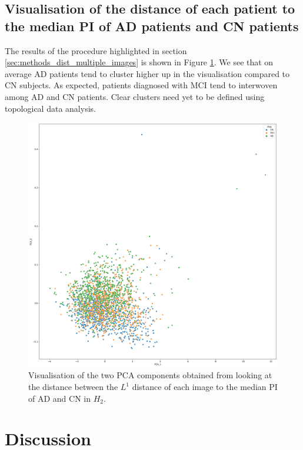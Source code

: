 \documentclass{article}
\begin{document}
\subsection{Visualisation of the distance of each patient to the median PI of AD patients and CN patients}

The results of the procedure highlighted in section \ref{sec:methods_dist_multiple_images} is shown
in Figure \ref{fig:vis_pca_ad_cn}. We see that on average AD patients tend to cluster higher up in
the visualisation compared to CN subjects. As expected, patients diagnosed with MCI tend to
interwoven among AD and CN patients. Clear clusters need yet to be defined using topological
data analysis.

\begin{figure}
  \centering \includegraphics[width=\textwidth]{figures/cluster_CN_H_2_AD_H_2_PCA.png}
  \caption{Visualisation of the two PCA components obtained from looking at the distance between the
    $L^1$ distance of each image to the median PI of AD and CN in $H_2$.}
  \label{fig:vis_pca_ad_cn}
\end{figure}

\section{Discussion}\label{sec:discussion}
\end{document}
